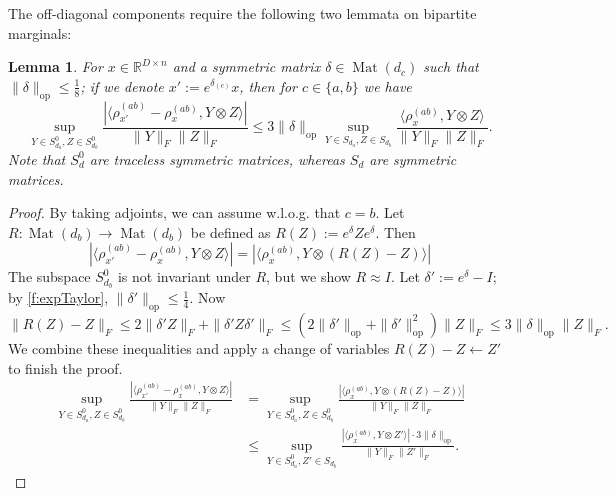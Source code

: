 \documentclass[aos]{imsart}
\newtheorem{lemma}[theorem]{Lemma}
\theoremstyle{definition}
\numberwithin{equation}{section}
\DeclareMathOperator{\op}{op}
\DeclareMathOperator{\Mat}{Mat}
\newcommand{\R}{{\mathbb{R}}}
\newcommand{\smallSym}{S}
\newcommand{\samp}{x}
\begin{document}
\begin{appendix}
The off-diagonal components require the following two lemmata on bipartite marginals:

\begin{lemma} \label{btoabRobustness}
For $\samp \in \R^{D \times n}$ and a symmetric matrix $\delta \in \Mat(d_{c})$ such that $\|\delta\|_{\op} \leq \frac{1}{8}$; if we denote $\samp' := e^{\delta_{(c)}} \samp$, then for $c \in \{a,b\}$ we have
\[ \sup_{Y \in \smallSym_{d_{a}}^{0}, Z \in \smallSym_{d_{b}}^{0}} \frac{|\langle \rho_{\samp'}^{(ab)} - \rho_{\samp}^{(ab)}, Y \otimes Z \rangle|}{\|Y\|_{F} \|Z\|_{F}} \leq 3 \|\delta\|_{\op} \sup_{Y \in \smallSym_{d_{a}}, Z \in \smallSym_{d_{b}}} \frac{\langle \rho_{\samp}^{(ab)}, Y \otimes Z \rangle}{\|Y\|_{F} \|Z\|_{F}}.        \]
Note that $\smallSym_{d}^{0}$ are traceless symmetric matrices, whereas $\smallSym_{d}$ are symmetric matrices.
\end{lemma}
\begin{proof}
By taking adjoints, we can assume w.l.o.g. that $c = b$. Let $R : \Mat(d_{b}) \to \Mat(d_{b})$ be defined as $R(Z) :=  e^{\delta} Z e^{\delta}$. Then
\[ |\langle \rho_{\samp'}^{(ab)} - \rho_{\samp}^{(ab)}, Y \otimes Z \rangle| = |\langle \rho_{\samp}^{(ab)}, Y \otimes (R(Z) - Z) \rangle|  \]
The subspace $\smallSym_{d_{b}}^{0}$ is not invariant under $R$, but we show $R \approx I$. Let $\delta' :=  e^{\delta} - I$; by \cref{f:expTaylor}, $\|\delta'\|_{\op} \leq \frac{1}{4}$. Now
\[ \|R(Z) - Z\|_{F} \leq 2 \|\delta' Z\|_{F} + \|\delta' Z \delta'\|_{F} \leq (2 \|\delta'\|_{\op} + \|\delta'\|_{\op}^{2}) \|Z\|_{F} \leq 3\|\delta\|_{\op}\|Z\|_{F}.    \]
We combine these inequalities and apply a change of variables $R(Z) - Z \leftarrow Z'$ to finish the proof.
\begin{align*} \sup_{Y \in \smallSym_{d_{a}}^{0}, Z \in \smallSym_{d_{b}}^{0}} \frac{|\langle \rho_{\samp'}^{(ab)} - \rho_{\samp}^{(ab)}, Y \otimes Z \rangle|}{\|Y\|_{F} \|Z\|_{F}}
& = \sup_{Y \in \smallSym_{d_{a}}^{0}, Z \in \smallSym_{d_{b}}^{0}}\frac{|\langle \rho_{\samp}^{(ab)}, Y \otimes (R(Z) - Z) \rangle|}{\|Y\|_F\|Z\|_F} \\
&\leq \sup_{Y \in \smallSym_{d_{a}}^{0}, Z' \in \smallSym_{d_{b}}} \frac{|\langle \rho_{\samp}^{(ab)}, Y \otimes Z' \rangle| \cdot 3 \|\delta\|_{\op}}{\|Y\|_F\|Z'\|_F}.
\end{align*}
\end{proof}


\end{appendix}
\end{document}

